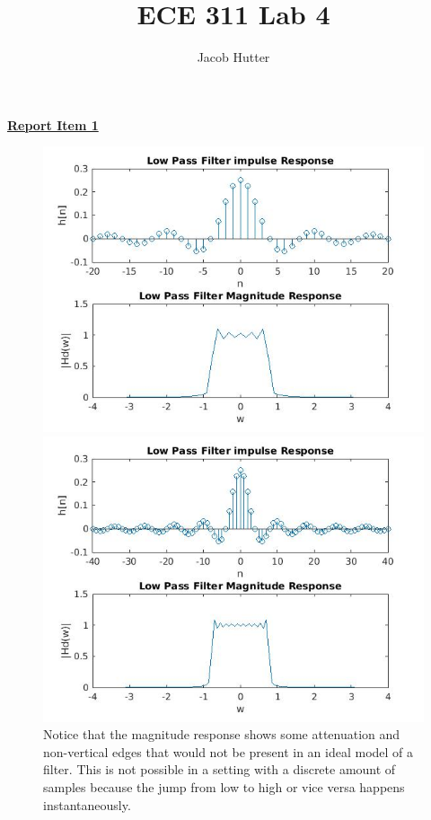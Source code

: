 \documentclass{article}
\author{Jacob Hutter}
\title{ECE 311 Lab 4}
\begin{document}
\maketitle
\color{red}
\underline{\textbf{Report Item 1}}
\color{black}

\begin{figure}[H]
\includegraphics[scale = .5]{1_lpf_20}
\includegraphics[scale = .5]{1_lpf_40}
\\ Notice that the magnitude response shows some attenuation and non-vertical edges that would not be present in an ideal model of a filter. This is not possible in a setting with a discrete amount of samples because the jump from low to high or vice versa happens instantaneously. 
\end{figure}
\end{document}
